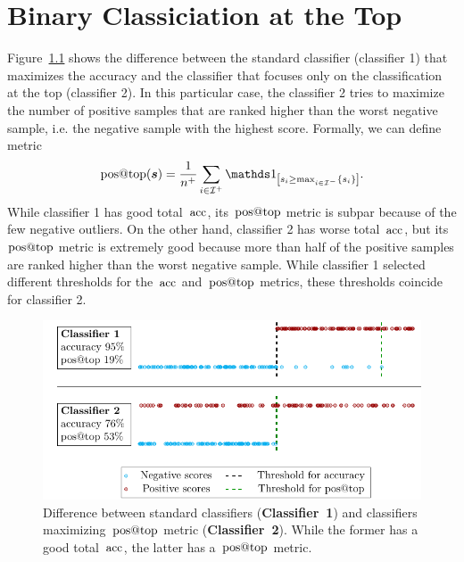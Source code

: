 \chapter{Binary Classiciation at the Top}\label{chap: framework}

Figure~\ref{fig: standard vs. aatp} shows the difference between the standard classifier (classifier 1) that maximizes the accuracy and the classifier that focuses only on the classification at the top (classifier 2). In this particular case, the classifier 2 tries to maximize the number of positive samples that are ranked higher than the worst negative sample, i.e. the negative sample with the highest score. Formally, we can define metric
\begin{equation*}
  \postop(\bm{s}) = \frac{1}{n^+} \sum_{i \in \I^+} \Iverson{s_i \ge \max_{i \in \I^-}\{s_i\}}.
\end{equation*}
While classifier 1 has good total~$\operatorname{acc}$, its~$\operatorname{pos@top}$ metric is subpar because of the few negative outliers. On the other hand, classifier 2 has worse total~$\operatorname{acc}$, but its~$\operatorname{pos@top}$ metric is extremely good because more than half of the positive samples are ranked higher than the worst negative sample. While classifier 1 selected different thresholds for the~$\operatorname{acc}$ and~$\operatorname{pos@top}$ metrics, these thresholds coincide for classifier 2.

\begin{figure}
  \centering
  \includegraphics[width = 0.95\linewidth]{images/standard_aatp_comparison.pdf}
  \caption{Difference between standard classifiers (\textbf{Classifier~1}) and classifiers maximizing~$\operatorname{pos@top}$ metric (\textbf{Classifier~2}). While the former has a good total~$\operatorname{acc}$, the latter has a~$\operatorname{pos@top}$ metric.}
  \label{fig: standard vs. aatp}
\end{figure}

